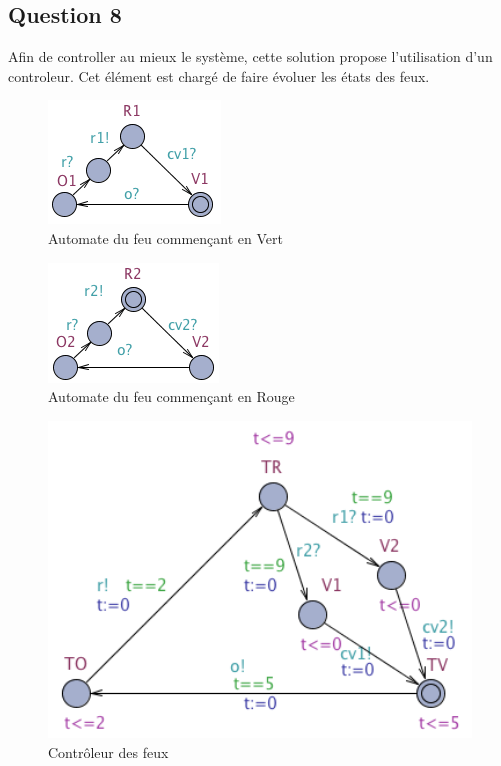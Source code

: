 \documentclass[11pt]{article}
\begin{document}
\subsection{Question 8}

Afin de controller au mieux le système, cette solution propose l'utilisation d'un controleur. Cet élément est chargé de faire évoluer les états des feux. 

\begin{figure}[H]
	\centering
	\includegraphics{ressources/part2/Q8-1.png}
	\caption{Automate du feu commençant en Vert}
\end{figure}

\begin{figure}[H]
	\centering
	\includegraphics{ressources/part2/Q8-2.png}
	\caption{Automate du feu commençant en Rouge}
\end{figure}

\begin{figure}[H]
	\centering
	\includegraphics[width=1\textwidth]{ressources/part2/Q8-3.png}
	\caption{Contrôleur des feux}
\end{figure}
\end{document}
